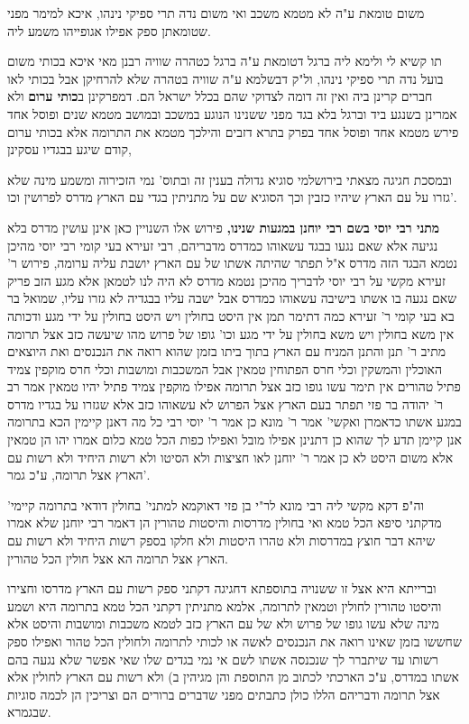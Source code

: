 \documentclass[12pt, openany]{book}
\begin{document}
{משום טומאת ע"ה לא מטמא משכב ואי משום נדה תרי ספיקי נינהו, איכא למימר מפני שטומאתן ספק אפילו אגופייהו משמע ליה.\par תו קשיא לי ולימא ליה ברגל דטומאת ע"ה ברגל כטהרה שוויה רבנן מאי איכא בכותי משום בועל נדה תרי ספיקי נינהו, ול"ק דבשלמא ע"ה שוויה בטהרה שלא להרחיקן אבל בכותי לאו חברים קרינן ביה ואין זה דומה לצדוקי שהם בכלל ישראל הם. 
 דמפרקינן ב\textbf{כותי ערום}  ולא אמרינן בשנגע ביד וברגל בלא בגד מפני ששנינו הנוגע במשכב ובמושב מטמא שנים ופוסל אחד פירש מטמא אחד ופוסל אחד בפרק בתרא דזבים והילכך מטמא את התרומה אלא בכותי ערום קודם שיגע בבגדיו עסקינן,\par ובמסכת חגיגה מצאתי בירושלמי סוגיא גדולה בענין זה ובתוס' נמי הזכירוה ומשמע מינה שלא גזרו על עם הארץ שיהיו כזבין וכך הסוגיא שם על מתניתין בגדי עם הארץ מדרס לפרושין וכו'. 
\par\textbf{מתני רבי יוסי בשם רבי יוחנן במגעות שנינו,}  פירוש אלו השנויין כאן אינן עושין מדרס בלא נגיעה אלא שאם נגעו בבגד עשאוהו כמדרס מדבריהם, רבי זעירא בעי קומי רבי יוסי מהיכן נטמא הבגד הזה מדרס א"ל תפתר שהיתה אשתו של עם הארץ יושבת עליה ערומה, פירוש ר' זעירא מקשי על רבי יוסי לדבריך מהיכן נטמא מדרס לא היה לנו לטמאן אלא מגע הזב פריק שאם נגעה בו אשתו בישיבה עשאוהו כמדרס אבל ישבה עליו בבגדיה לא גזרו עליו, שמואל בר בא בעי קומי ר' זעירא כמה דתימר תמן אין היסט בחולין ויש היסט בחולין על ידי מגע ודכותה אין משא בחולין ויש משא בחולין על ידי מגע וכו' גופו של פרוש מהו שיעשה כזב אצל תרומה מתיב ר' תנן והתנן המניח עם הארץ בתוך ביתו בזמן שהוא רואה את הנכנסים ואת היוצאים האוכלין והמשקין וכלי חרס הפתוחין טמאין אבל המשכבות ומושבות וכלי חרס מוקפין צמיד פתיל טהורים אין תימר עשו גופו כזב אצל תרומה אפילו מוקפין צמיד פתיל יהיו טמאין אמר רב ר' יהודה בר פזי תפתר בעם הארץ אצל הפרוש לא עשאוהו כזב אלא שגזרו על בגדיו מדרס במגע אשתו כדאמרן ואקשי' אמר ר' מונא כן אמר ר' יוסי רבי כל מה דאנן קיימין הכא בתרומה אנן קיימן תדע לך שהוא כן דתנינן אפילו מובל ואפילו כפות הכל טמא כלום אמרו יהו הן טמאין אלא משום היסט לא כן אמר ר' יוחנן לאו חציצות ולא הסיטו ולא רשות היחיד ולא רשות עם הארץ אצל תרומה, ע"כ גמר'.\par  וה"פ דקא מקשי ליה רבי מונא לר"י בן פזי דאוקמא למתני' בחולין דודאי בתרומה קיימי' מדקתני סיפא הכל טמא ואי בחולין מדרסות והיסטות טהורין הן דאמר רבי יוחנן שלא אמרו שיהא דבר חוצץ במדרסות ולא טהרו היסטות ולא חלקו בספק רשות היחיד ולא רשות עם הארץ אצל תרומה הא אצל חולין הכל טהורין.\par וברייתא היא אצל זו ששנויה בתוספתא דחגיגה דקתני ספק רשות עם הארץ מדרסו וחצירו והיסטו טהורין לחולין וטמאין לתרומה, אלמא מתניתין דקתני הכל טמא בתרומה היא ושמע מינה שלא עשו גופו של פרוש ולא של עם הארץ כזב לטמא משכבות ומושבות והיסט אלא שחששו בזמן שאינו רואה את הנכנסים לאשה או לכותי לתרומה ולחולין הכל טהור ואפילו ספק רשותו עד שיתברר לך שנכנסה אשתו לשם אי נמי בגדים שלו שאי אפשר שלא נגעה בהם אשתו במדרס, ע"כ הארכתי לכתוב מן התוספת והן מגיהין ב) ולא רשות עם הארץ לחולין אלא אצל תרומה ודבריהם הללו כולן כתבתים מפני שדברים ברורים הם וצריכין הן לכמה סוגיות שבגמרא. 
\par}
\end{document}
